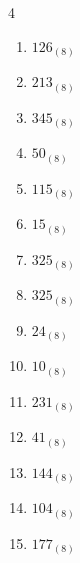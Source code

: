 \begin{multicols}{4}
\begin{enumerate}
        \phantom{$=116$}

  \item $126_{(8)}$

        \phantom{$=86$}

  \item $213_{(8)}$

        \phantom{$=139$}

  \item $345_{(8)}$

        \phantom{$=229$}

  \item $50_{(8)}$

        \phantom{$=40$}

  \item $115_{(8)}$

        \phantom{$=77$}

  \item $15_{(8)}$

        \phantom{$=13$}

  \item $325_{(8)}$

        \phantom{$=213$}

\columnbreak %

\resetques

  \item $325_{(8)}$

        \phantom{$=213$}

  \item $24_{(8)}$

        \phantom{$=20$}

  \item $10_{(8)}$

        \phantom{$=8$}

  \item $231_{(8)}$

        \phantom{$=153$}

  \item $41_{(8)}$

        \phantom{$=33$}

  \item $144_{(8)}$

        \phantom{$=100$}

  \item $104_{(8)}$

        \phantom{$=68$}

  \item $177_{(8)}$


\end{enumerate}
\end{multicols}
